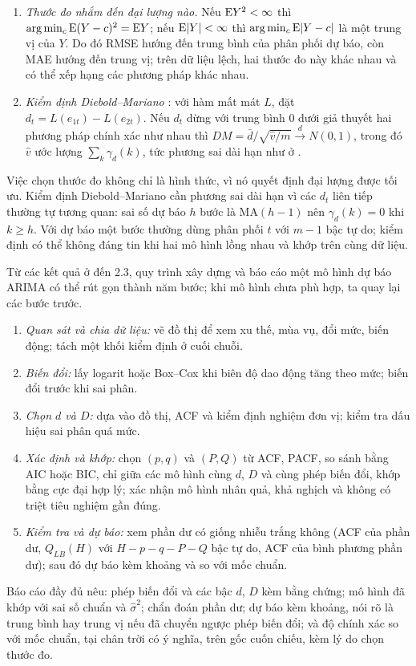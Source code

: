 \begin{kq}
\begin{enumerate}[label=(\roman*),leftmargin=*,itemsep=1pt]
\item \emph{Thước đo nhắm đến đại lượng nào.} Nếu $\mathrm{E} Y^2<\infty$ thì $\arg\min_c\mathrm{E}(Y-c)^2=\mathrm{E} Y$; nếu $\mathrm{E}|Y|<\infty$ thì $\arg\min_c\mathrm{E}|Y-c|$ là một trung vị của $Y$. Do đó RMSE hướng đến trung bình của phân phối dự báo, còn MAE hướng đến trung vị; trên dữ liệu lệch, hai thước đo này khác nhau và có thể xếp hạng các phương pháp khác nhau.
\item \emph{Kiểm định Diebold--Mariano} : với hàm mất mát $L$, đặt $d_t=L(e_{1t})-L(e_{2t})$. Nếu $d_t$ dừng với trung bình $0$ dưới giả thuyết hai phương pháp chính xác như nhau thì $DM=\bar d\big/\sqrt{\hat v/m}\xrightarrow{d}N(0,1)$, trong đó $\hat v$ ước lượng $\sum_k\gamma_d(k)$, tức phương sai dài hạn như ở .
\end{enumerate}
\end{kq}
Việc chọn thước đo không chỉ là hình thức, vì nó quyết định đại lượng được tối ưu. Kiểm định Diebold--Mariano cần phương sai dài hạn vì các $d_t$ liên tiếp thường tự tương quan: sai số dự báo $h$ bước là MA$(h-1)$ nên $\gamma_d(k)=0$ khi $k\ge h$. Với dự báo một bước thường dùng phân phối $t$ với $m-1$ bậc tự do; kiểm định có thể không đáng tin khi hai mô hình lồng nhau và khớp trên cùng dữ liệu.

Từ các kết quả ở  đến 2.3, quy trình xây dựng và báo cáo một mô hình dự báo ARIMA có thể rút gọn thành năm bước; khi mô hình chưa phù hợp, ta quay lại các bước trước.
\begin{enumerate}[label=\textbf{Bước \arabic*.},leftmargin=2.2cm,itemsep=1pt]
\item \emph{Quan sát và chia dữ liệu:} vẽ đồ thị để xem xu thế, mùa vụ, đổi mức, biến động; tách một khối kiểm định ở cuối chuỗi.
\item \emph{Biến đổi:} lấy logarit hoặc Box--Cox khi biên độ dao động tăng theo mức; biến đổi trước khi sai phân.
\item \emph{Chọn $d$ và $D$:} dựa vào đồ thị, ACF và kiểm định nghiệm đơn vị; kiểm tra dấu hiệu sai phân quá mức.
\item \emph{Xác định và khớp:} chọn $(p,q)$ và $(P,Q)$ từ ACF, PACF, so sánh bằng AIC hoặc BIC, chỉ giữa các mô hình cùng $d$, $D$ và cùng phép biến đổi, khớp bằng cực đại hợp lý; xác nhận mô hình nhân quả, khả nghịch và không có triệt tiêu nghiệm gần đúng.
\item \emph{Kiểm tra và dự báo:} xem phần dư có giống nhiễu trắng không (ACF của phần dư, $Q_{LB}(H)$ với $H-p-q-P-Q$ bậc tự do, ACF của bình phương phần dư); sau đó dự báo kèm khoảng và so với mốc chuẩn.
\end{enumerate}
Báo cáo đầy đủ nêu: phép biến đổi và các bậc $d$, $D$ kèm bằng chứng; mô hình đã khớp với sai số chuẩn và $\hat\sigma^2$; chẩn đoán phần dư; dự báo kèm khoảng, nói rõ là trung bình hay trung vị nếu đã chuyển ngược phép biến đổi; và độ chính xác so với mốc chuẩn, tại chân trời có ý nghĩa, trên gốc cuốn chiếu, kèm lý do chọn thước đo.
